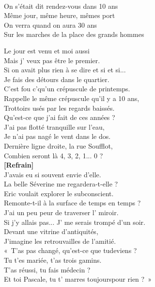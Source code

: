 \documentclass{novel}
\begin{document}
\begin{multicols}{2}
\begin{bfseries}
[Refrain:] \\
On s'était dit rendez-vous dans 10 ans \\
Même jour, même heure, mêmes port \\
On verra quand on aura 30 ans \\
Sur les marches de la place des grands hommes \\
\end{bfseries}

Le jour est venu et moi aussi \\
Mais j' veux pas être le premier. \\
Si on avait plus rien à se dire et si et si... \\

Je fais des détours dans le quartier. \\
C'est fou c'qu'un crépuscule de printemps. \\
Rappelle le même crépuscule qu'il y a 10 ans, \\
Trottoirs usés par les regards baissés. \\
Qu'est-ce que j'ai fait de ces années ? \\

J'ai pas flotté tranquille sur l'eau, \\
Je n'ai pas nagé le vent dans le dos. \\
Dernière ligne droite, la rue Soufflot, \\
Combien seront là 4, 3, 2, 1... 0 ? \\

\textbf{[Refrain]} \\

J'avais eu si souvent envie d'elle. \\
La belle Séverine me regardera-t-elle ? \\
Eric voulait explorer le subconscient. \\
Remonte-t-il à la surface de temps en temps ? \\
J'ai un peu peur de traverser l' miroir. \\
Si j'y allais pas... J' me serais trompé d'un soir. \\
Devant une vitrine d'antiquités, \\
J'imagine les retrouvailles de l'amitié. \\
«~T'as pas changé, qu'est-ce que tudeviens ? \\
Tu t'es mariée, t'as trois gamins. \\
T'as réussi, tu fais médecin ? \\
Et toi Pascale, tu t' marres toujourspour rien ?~» \\


\end{multicols}
\end{document}
